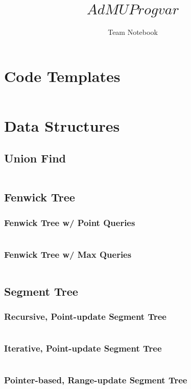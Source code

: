 \documentclass[8pt,a4paper,landscape,oneside]{amsart}
\title{$AdMU Progvar$}
\subtitle{Team Notebook}
\date{\ddmmyyyydate{\today{}}}
\newcommand{\code}[1]{\inputminted[fontsize=\normalsize,baselinestretch=1]{cpp}{_code/#1}}
\begin{document}
\begin{multicols*}{3}
\maketitle
\thispagestyle{fancy}
\vspace{-3em}
\tableofcontents


\section{Code Templates}
	\code{header.cpp}
\section{Data Structures}
  \subsection{Union Find}
    \code{data-structures/union_find.cpp}
  \subsection{Fenwick Tree}
		\subsubsection{Fenwick Tree w/ Point Queries}
			\code{data-structures/fenwick.cpp}
    \subsubsection{Fenwick Tree w/ Max Queries}
      \code{data-structures/fenwick_max.cpp}
  \subsection{Segment Tree}
    \subsubsection{Recursive, Point-update Segment Tree}
      \code{data-structures/segtree_rec_PU_RQ.cpp}
    \subsubsection{Iterative, Point-update Segment Tree}
      \code{data-structures/segtree_iter_PU_RQ.cpp}
    \subsubsection{Pointer-based, Range-update Segment Tree}
      \code{data-structures/segtree_rec_RU_RQ.cpp}

\end{multicols*}
\end{document}
